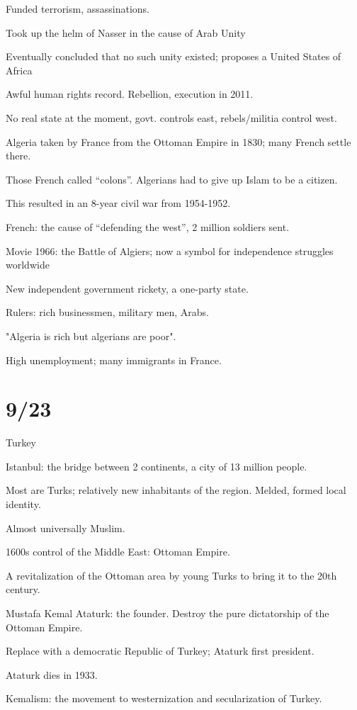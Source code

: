 \documentclass[12pt]{article}
\begin{document}
Funded terrorism, assassinations.

Took up the helm of Nasser in the cause of Arab Unity

Eventually concluded that no such unity existed; proposes a United States of Africa

Awful human rights record.  Rebellion, execution in 2011.

No real state at the moment, govt. controls east, rebels/militia control west.

\noindent
Algeria taken by France from the Ottoman Empire in 1830; many French settle there.

Those French called ``colons''.  Algerians had to give up Islam to be a citizen.

This resulted in an 8-year civil war from 1954-1952.

French: the cause of ``defending the west'', 2 million soldiers sent.

Movie 1966: the Battle of Algiers; now a symbol for independence struggles worldwide

New independent government rickety, a one-party state.

Rulers: rich businessmen, military men, Arabs.

"Algeria is rich but algerians are poor".

High unemployment; many immigrants in France.

\section{9/23}

\noindent
Turkey

Istanbul: the bridge between 2 continents, a city of 13 million people.

Most are Turks; relatively new inhabitants of the region.  Melded, formed local identity.

Almost universally Muslim.

1600s control of the Middle East: Ottoman Empire.

A revitalization of the Ottoman area by young Turks to bring it to the 20th century.

Mustafa Kemal Ataturk: the founder.  Destroy the pure dictatorship of the Ottoman Empire.

Replace with a democratic Republic of Turkey; Ataturk first president.

Ataturk dies in 1933.

Kemalism: the movement to westernization and secularization of Turkey.
\end{document}
